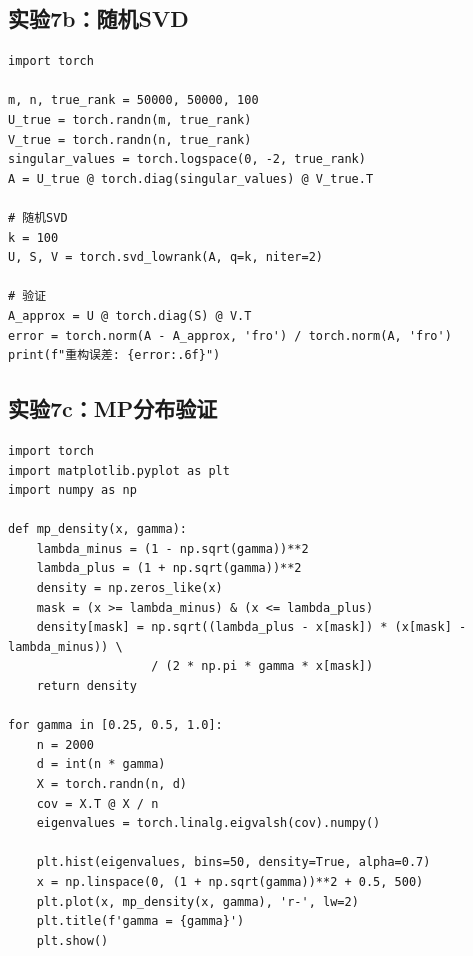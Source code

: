 \documentclass[11pt,a4paper]{ctexart}
\theoremstyle{definition}
\theoremstyle{remark}
\begin{document}
\subsection{实验7b：随机SVD}

\begin{lstlisting}
import torch

m, n, true_rank = 50000, 50000, 100
U_true = torch.randn(m, true_rank)
V_true = torch.randn(n, true_rank)
singular_values = torch.logspace(0, -2, true_rank)
A = U_true @ torch.diag(singular_values) @ V_true.T

# 随机SVD
k = 100
U, S, V = torch.svd_lowrank(A, q=k, niter=2)

# 验证
A_approx = U @ torch.diag(S) @ V.T
error = torch.norm(A - A_approx, 'fro') / torch.norm(A, 'fro')
print(f"重构误差: {error:.6f}")
\end{lstlisting}

\subsection{实验7c：MP分布验证}

\begin{lstlisting}
import torch
import matplotlib.pyplot as plt
import numpy as np

def mp_density(x, gamma):
    lambda_minus = (1 - np.sqrt(gamma))**2
    lambda_plus = (1 + np.sqrt(gamma))**2
    density = np.zeros_like(x)
    mask = (x >= lambda_minus) & (x <= lambda_plus)
    density[mask] = np.sqrt((lambda_plus - x[mask]) * (x[mask] - lambda_minus)) \
                    / (2 * np.pi * gamma * x[mask])
    return density

for gamma in [0.25, 0.5, 1.0]:
    n = 2000
    d = int(n * gamma)
    X = torch.randn(n, d)
    cov = X.T @ X / n
    eigenvalues = torch.linalg.eigvalsh(cov).numpy()
    
    plt.hist(eigenvalues, bins=50, density=True, alpha=0.7)
    x = np.linspace(0, (1 + np.sqrt(gamma))**2 + 0.5, 500)
    plt.plot(x, mp_density(x, gamma), 'r-', lw=2)
    plt.title(f'gamma = {gamma}')
    plt.show()
\end{lstlisting}

\end{document}
